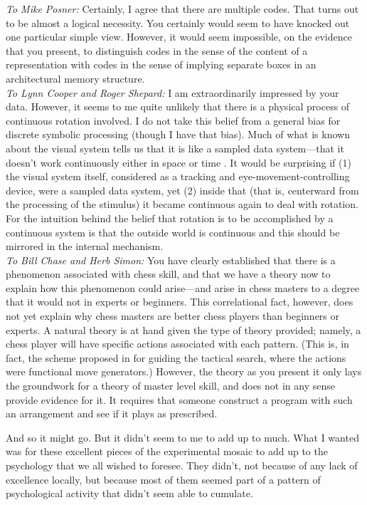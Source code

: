\documentclass{paper}
\newcounter{oldpagecounter}
\newcommand\oldpage{\stepcounter{oldpagecounter}\marginpar{\footnotesize{\textcolor{mygrey}{pg. \arabic{oldpagecounter}}}}}
\begin{document}
\begin{adjustwidth}{2.5em}{2.5em}
\noindent \textit{To Mike Posner:} Certainly, I agree that there are multiple codes. That turns out to be almost a logical necessity. You certainly would seem to have knocked out one particular simple view. However, it would seem impossible, on the evidence that you present, to distinguish codes in the sense of the content of a representation with codes in the sense of implying separate boxes in an architectural memory structure.\\

\noindent \textit{To Lynn Cooper and Roger Shepard:} I am extraordinarily impressed by your data. However, it seems to me quite unlikely that there is a physical process of continuous rotation involved. I do not take this belief from a general bias for discrete symbolic processing (though I have that bias). Much of what is known about the visual system tells us that it is like a sampled data system---that it doesn't work continuously either in space or time \citep{HubelWiesel1962, Stark1968}. It would be surprising if (1) the visual system itself, considered as a tracking and eye-movement-controlling device, were a sampled data system, yet (2) inside that (that is, centerward from the processing of the stimulus) it became continuous again to deal with rotation. For the intuition behind the belief that rotation is to be accomplished by a continuous system is that the outside world is continuous and this should be mirrored in the internal mechanism. \\

\noindent \textit{To Bill Chase and Herb Simon:} You have clearly established that there is a phenomenon associated with chess skill, and that we have a theory now to explain how this phenomenon could arise---and arise in chess masters to a degree that it would not in experts or beginners. This correlational fact, however, does not yet explain why chess masters are better chess \oldpage players than beginners or experts. A natural theory is at hand given the type of theory provided; namely, a chess player will have specific actions associated with each pattern. (This is, in fact, the scheme proposed in \cite{NewellSimon1965} for guiding the tactical search, where the actions were functional move generators.) However, the theory as you present it only lays the groundwork for a theory of master level skill, and does not in any sense provide evidence for it. It requires that someone construct a program with such an arrangement and see if it plays as prescribed.\\
\end{adjustwidth}
And so it might go. But it didn't seem to me to add up to much. What I wanted was for these excellent pieces of the experimental mosaic to add up to the psychology that we all wished to foresee. They didn't, not because of any lack of excellence locally, but because most of them seemed part of a pattern of psychological activity that didn't seem able to cumulate.
\end{document}
